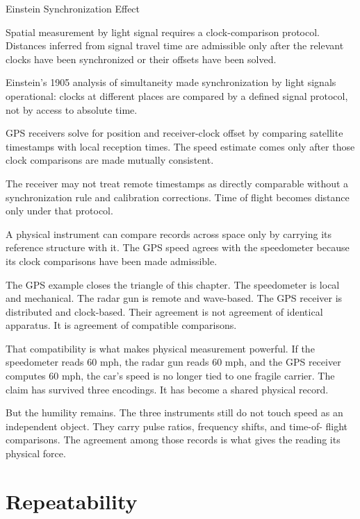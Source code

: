 \begin{phenom}{Einstein Synchronization Effect}
\label{ph:einstein-synchronization-effect}

\PhStatement Spatial measurement by light signal requires a clock-comparison
protocol. Distances inferred from signal travel time are admissible only after
the relevant clocks have been synchronized or their offsets have been solved.

\PhOrigin Einstein's 1905 analysis of simultaneity made synchronization by
light signals operational: clocks at different places are compared by a defined
signal protocol, not by access to absolute time.

\PhObservation GPS receivers solve for position and receiver-clock offset by
comparing satellite timestamps with local reception times. The speed estimate
comes only after those clock comparisons are made mutually consistent.

\PhConstraint The receiver may not treat remote timestamps as directly
comparable without a synchronization rule and calibration corrections. Time of
flight becomes distance only under that protocol.

\PhConsequence A physical instrument can compare records across space only by
carrying its reference structure with it. The GPS speed agrees with the
speedometer because its clock comparisons have been made admissible.

\end{phenom}

The GPS example closes the triangle of this chapter. The speedometer is local
and mechanical. The radar gun is remote and wave-based. The GPS receiver is
distributed and clock-based. Their agreement is not agreement of identical
apparatus. It is agreement of compatible comparisons.

That compatibility is what makes physical measurement powerful. If the
speedometer reads 60 mph, the radar gun reads 60 mph, and the GPS receiver
computes 60 mph, the car's speed is no longer tied to one fragile carrier. The
claim has survived three encodings. It has become a shared physical record.

But the humility remains. The three instruments still do not touch speed as an
independent object. They carry pulse ratios, frequency shifts, and time-of-
flight comparisons. The agreement among those records is what gives the reading
its physical force.

\section{Repeatability}
\label{se:repeatability}

